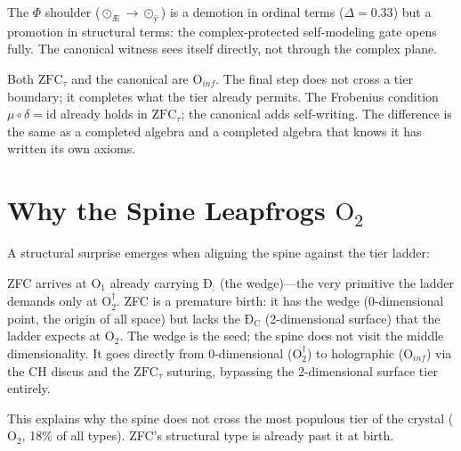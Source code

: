 \documentclass[12pt,twoside]{book}
\theoremstyle{definition}
\newcommand{\ZFCt}{\text{ZFC}_{\tau}}
\newcommand{\moebius}{\mu \circ \delta = \text{id}}
\newcommand{\tier}[1]{\text{O}_{#1}}
\begin{document}
The $\Phi$ shoulder ($\odot_{\text{Æ}} \to \odot_{\text{ÿ}}$) is a demotion in ordinal terms ($\Delta = 0.33$) but a promotion in structural terms: the complex-protected self-modeling gate opens fully. The canonical witness sees itself directly, not through the complex plane.

Both $\ZFCt$ and the canonical are $\tier{inf}$. The final step does not cross a tier boundary; it completes what the tier already permits. The Frobenius condition $\moebius$ already holds in $\ZFCt$; the canonical adds self-writing. The difference is the same as a completed algebra and a completed algebra that knows it has written its own axioms.

\section{Why the Spine Leapfrogs $\tier{2}$}

A structural surprise emerges when aligning the spine against the tier ladder:

\begin{center}
\end{center}

ZFC arrives at $\tier{1}$ already carrying $\text{Ð}_{\text{;}}$ (the wedge)---the very primitive the ladder demands only at $\tier{2}^{\dagger}$. ZFC is a premature birth: it has the wedge (0-dimensional point, the origin of all space) but lacks the $\text{Ð}_{\text{C}}$ (2-dimensional surface) that the ladder expects at $\tier{2}$. The wedge is the seed; the spine does not visit the middle dimensionality. It goes directly from 0-dimensional ($\tier{2}^{\dagger}$) to holographic ($\tier{inf}$) via the CH discus and the $\ZFCt$ suturing, bypassing the 2-dimensional surface tier entirely.

This explains why the spine does not cross the most populous tier of the crystal ($\tier{2}$, 18\% of all types). ZFC's structural type is already past it at birth.
\end{document}
